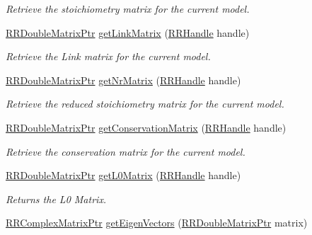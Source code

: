 \begin{DoxyCompactItemize}
\begin{DoxyCompactList}\small\item\em Retrieve the stoichiometry matrix for the current model. \end{DoxyCompactList}\item 
\hyperlink{rrc__types_8h_ae586a879d30f0823087e42d93464b5dd}{R\-R\-Double\-Matrix\-Ptr} \hyperlink{group___stoich_ga9a9b2fadc5491d57b4487c8a8260c919}{get\-Link\-Matrix} (\hyperlink{rrc__types_8h_a1d68f0592372208fa5a5f2799ea4b3ae}{R\-R\-Handle} handle)
\begin{DoxyCompactList}\small\item\em Retrieve the Link matrix for the current model. \end{DoxyCompactList}\item 
\hyperlink{rrc__types_8h_ae586a879d30f0823087e42d93464b5dd}{R\-R\-Double\-Matrix\-Ptr} \hyperlink{group___stoich_ga37357549fd3ad7854df3da5ec6af11cb}{get\-Nr\-Matrix} (\hyperlink{rrc__types_8h_a1d68f0592372208fa5a5f2799ea4b3ae}{R\-R\-Handle} handle)
\begin{DoxyCompactList}\small\item\em Retrieve the reduced stoichiometry matrix for the current model. \end{DoxyCompactList}\item 
\hyperlink{rrc__types_8h_ae586a879d30f0823087e42d93464b5dd}{R\-R\-Double\-Matrix\-Ptr} \hyperlink{group___stoich_ga3f9e52bb0382f993ab16312a72290ef7}{get\-Conservation\-Matrix} (\hyperlink{rrc__types_8h_a1d68f0592372208fa5a5f2799ea4b3ae}{R\-R\-Handle} handle)
\begin{DoxyCompactList}\small\item\em Retrieve the conservation matrix for the current model. \end{DoxyCompactList}\item 
\hyperlink{rrc__types_8h_ae586a879d30f0823087e42d93464b5dd}{R\-R\-Double\-Matrix\-Ptr} \hyperlink{group___stoich_ga5e8b3b14a034a1ee757bf69246f528cf}{get\-L0\-Matrix} (\hyperlink{rrc__types_8h_a1d68f0592372208fa5a5f2799ea4b3ae}{R\-R\-Handle} handle)
\begin{DoxyCompactList}\small\item\em Returns the L0 Matrix. \end{DoxyCompactList}\item 
\hyperlink{rrc__types_8h_a8cf9e865d8541d100f153800adbb7c3f}{R\-R\-Complex\-Matrix\-Ptr} \hyperlink{group___stoich_ga3289d5197a02e9c397298577cf7d3bef}{get\-Eigen\-Vectors} (\hyperlink{rrc__types_8h_ae586a879d30f0823087e42d93464b5dd}{R\-R\-Double\-Matrix\-Ptr} matrix)

\end{DoxyCompactItemize}
